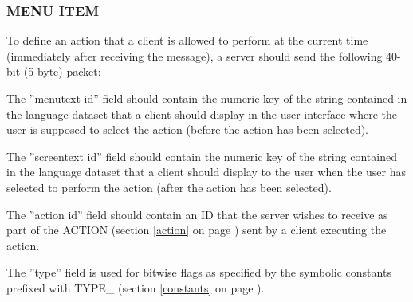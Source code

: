 \documentclass[a4paper,11pt]{article}
\begin{document}
\subsubsection{MENU ITEM}
\label{server_menu_item}
\hfill\begin{minipage}{\dimexpr\textwidth-1.4cm}
To define an action that a client is allowed to perform at
the current time (immediately after receiving the message),
a server should send the following 40-bit (5-byte) packet:

\vspace{0.2cm}


\vspace{0.5cm}

The ''menutext id'' field should contain the numeric key of the
string contained in the language dataset that a client should
display in the user interface where the user is supposed
to select the action (before the action has been selected).

\vspace{0.3cm}

The ''screentext id'' field should contain the numeric key of
the string contained in the language dataset that a client should
display to the user when the user has selected to perform the action
(after the action has been selected).

\vspace{0.3cm}

The ''action id'' field should contain an ID that the server
wishes to receive as part of the ACTION (section \ref{action} on page \pageref{action})
sent by a client executing the action.

\vspace{0.3cm}

The ''type'' field is used for bitwise flags as specified by the
symbolic constants prefixed with TYPE\_ (section \ref{constants} on page \pageref{constants}).


\end{minipage}
\end{document}
